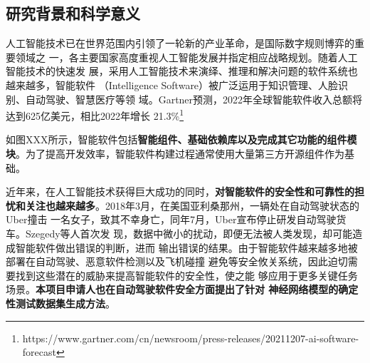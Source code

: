 
\subsection{研究背景和科学意义}



%
人工智能技术已在世界范围内引领了一轮新的产业革命，是国际数字规则博弈的重要领域之
一，各主要国家高度重视人工智能发展并指定相应战略规划。随着人工智能技术的快速发
展，采用人工智能技术来演绎、推理和解决问题的软件系统也越来越多，智能软件
（Intelligence Software）被广泛运用于知识管理、人脸识别、自动驾驶、智慧医疗等领
域。Gartner预测，2022年全球智能软件收入总额将达到625亿美元，相比2022年增长
21.3\%\footnote{https://www.gartner.com/cn/newsroom/press-releases/20211207-ai-software-forecast}


如图XXX所示，智能软件包括\textbf{智能组件、基础依赖库以及完成其它功能的组件模
块}。为了提高开发效率，智能软件构建过程通常使用大量第三方开源组件作为基础。

近年来，在人工智能技术获得巨大成功的同时，\textbf{对智能软件的安全性和可靠性的担
忧和关注也越来越多}。2018年3月，在美国亚利桑那州，一辆处在自动驾驶状态的Uber撞击
一名女子，致其不幸身亡，同年7月，Uber宣布停止研发自动驾驶货车。Szegedy等人首次发
现，数据中微小的扰动，即便无法被人类发现，却可能造成智能软件做出错误的判断，进而
输出错误的结果。由于智能软件越来越多地被部署在自动驾驶、恶意软件检测以及飞机碰撞
避免等安全攸关系统，因此迫切需要找到这些潜在的威胁来提高智能软件的安全性，使之能
够应用于更多关键任务场景。\textbf{本项目申请人也在自动驾驶软件安全方面提出了针对
神经网络模型的确定性测试数据集生成方法}。 


